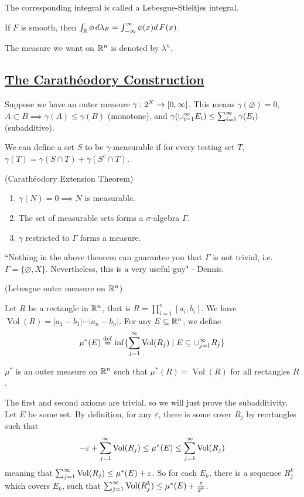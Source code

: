 \documentclass[x11names,reqno,14pt]{extarticle}
\newcommand{\seq}[2][\oo]{_{#2 = 1}^#1}
\DeclareMathOperator{\Vol}{Vol}
\begin{document}
The corresponding integral is called a Lebesgue-Stieltjes integral.

If $F$ is smooth, then $\int_{\mathbb{R}}\phi\,d\lambda_F = \int_{-\infty}^{\infty}\phi(x)d\,F(x)$.

The measure we want on $\mathbb{R}^n$ is denoted by $\lambda^n$. 

\subsection*{\underline{The Carath\'eodory Construction}}

Suppose we have an outer measure $\gamma:2^X\to[0,\infty]$. This means $\gamma(\varnothing) = 0$, $A \subset B \implies \gamma(A) \leq \gamma(B)$ (monotone), and $\gamma(\cup\seq{i}E_i) \leq \sum\seq{i}\gamma(E_i)$ (subadditive).

We can define a set $S$ to be $\gamma$-measurable if for every testing set $T$, $\gamma(T) = \gamma(S \cap T) + \gamma(S^c \cap T)$.

\thm (Carath\'eodory Extension Theorem)

\begin{enumerate}

\item $\gamma(N) = 0 \implies N$ is measurable. 

\item The set of measurable sets forms a $\sigma$-algebra $\Gamma$. 

\item $\gamma$ restricted to $\Gamma$ forms a measure. 

\end{enumerate}

``Nothing in the above theorem can guarantee you that $\Gamma$ is not trivial, i.e. $\Gamma = \{\varnothing, X\}$. Nevertheless, this is a very useful guy" - Dennis. 

 (Lebesgue outer measure on $\mathbb{R}^n$)

Let $R$ be a rectangle in $\mathbb{R}^n$, that is $R = \prod_{i=1}^n[a_i, b_i]$. We have $\Vol(R) = |a_1 - b_1|\cdots|a_n - b_n|$. For any $E \subseteq\mathbb{R}^n$, we define
\[
\mu^*(E) \eqdef \inf\{\sum\seq{j}\Vol(R_j) \mid E \subseteq \cup\seq{j}R_j\}
\] 

\prop

$\mu^*$ is an outer measure on $\mathbb{R}^n$ such that $\mu^*(R) = \Vol(R)$ for all rectangles $R$. 

\proof

The first and second axioms are trivial, so we will just prove the subadditivity. Let $E$ be some set. By definition, for any $\varepsilon$, there is some cover $R_j$ by recrtangles such that 
\[
-\varepsilon + \sum\seq{j}\Vol(R_j) \leq \mu^*(E) \leq \sum\seq{j}\Vol(R_j)
\]
meaning that $\sum\seq{j}\Vol(R_j) \leq \mu^*(E) + \varepsilon$. So for each $E_k$, there is a sequence $R^k_j$ which covers $E_k$, such that $\sum\seq{j}\Vol(R^k_j) \leq \mu^*(E) + \frac{\varepsilon}{2^k}$. 
\end{document}
